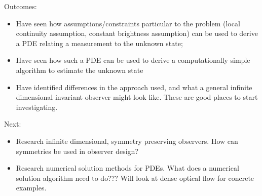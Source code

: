 Outcomes:
\begin{itemize}
\item Have seen how assumptions/constraints particular to the problem (local continuity assumption, constant brightness assumption) can be used to derive a PDE relating a measurement to the unknown state;
\item Have seen how such a PDE can be used to derive a computationally simple algorithm to estimate the unknown state
\item Have identified differences in the approach used, and what a general infinite dimensional invariant observer might look like. These are good places to start investigating.
\end{itemize}

Next:
\begin{itemize}
\item Research infinite dimensional, symmetry preserving observers. How can symmetries be used in observer design?
\item Research numerical solution methods for PDEs. What does a numerical solution algorithm need to do??? Will look at dense optical flow for concrete examples.
\end{itemize}

